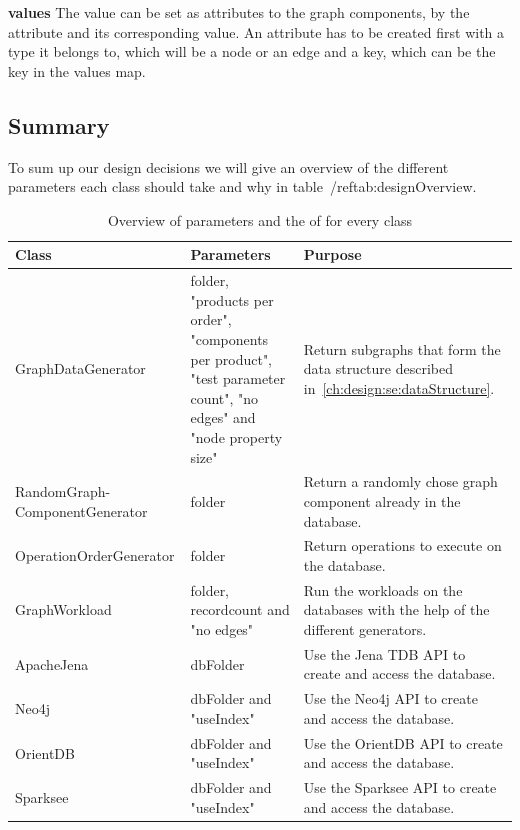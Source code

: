 \textbf{values} \newline
The value can be set as attributes to the graph components,
by the attribute and its corresponding value.
An attribute has to be created first with a type it belongs to,
which will be a node or an edge and a key,
which can be the key in the values map.

\subsection{Summary}
\label{ch:design:se:summary}
To sum up our design decisions we will give an overview of the different parameters each class should take and why in table~/ref{tab:designOverview}.

\begin{table}[h!]
  \begin{minipage}{\textwidth}
    \begin{tabularx}{\textwidth}{ | X | X | X | }
      \hline
      Class & Parameters & Purpose \\ \hline
      GraphDataGenerator & folder, "products per order", "components per product", "test parameter count", "no edges" and "node property size" & Return subgraphs that form the data structure described in~\ref{ch:design:se:dataStructure}. \\ \hline
      RandomGraph-\newline ComponentGenerator & folder & Return a randomly chose graph component already in the database. \\ \hline
      OperationOrderGenerator & folder & Return operations to execute on the database. \\ \hline
      GraphWorkload & folder, recordcount and "no edges" & Run the workloads on the databases with the help of the different generators. \\ \hline
      ApacheJena & dbFolder & Use the Jena TDB API to create and access the database. \\ \hline
      Neo4j & dbFolder and "useIndex" & Use the Neo4j API to create and access the database. \\ \hline
      OrientDB & dbFolder and "useIndex" & Use the OrientDB API to create and access the database. \\ \hline
      Sparksee & dbFolder and "useIndex" & Use the Sparksee API to create and access the database. \\ \hline
    \end{tabularx}
  \end{minipage}
  \caption{Overview of parameters and the of for every class}
  \label{tab:designOverview}
\end{table}

